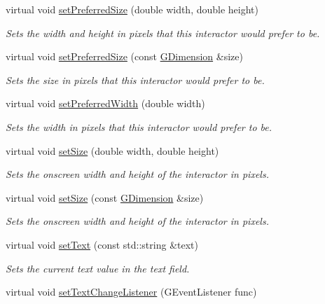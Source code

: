 \begin{DoxyCompactItemize}
virtual void \mbox{\hyperlink{classGInteractor_a042c5ae19430d765ef552371cae3632c}{set\+Preferred\+Size}} (double width, double height)
\begin{DoxyCompactList}\small\item\em Sets the width and height in pixels that this interactor would prefer to be. \end{DoxyCompactList}\item 
virtual void \mbox{\hyperlink{classGInteractor_aa22d9be4bc0e078bb0ea69b0fc9d7c75}{set\+Preferred\+Size}} (const \mbox{\hyperlink{classGDimension}{G\+Dimension}} \&size)
\begin{DoxyCompactList}\small\item\em Sets the size in pixels that this interactor would prefer to be. \end{DoxyCompactList}\item 
virtual void \mbox{\hyperlink{classGInteractor_a3db429ab2fa52efd187eec0ed8cdd9f2}{set\+Preferred\+Width}} (double width)
\begin{DoxyCompactList}\small\item\em Sets the width in pixels that this interactor would prefer to be. \end{DoxyCompactList}\item 
virtual void \mbox{\hyperlink{classGInteractor_aca25d49481f9bf5fc8f7df4c086c4ce7}{set\+Size}} (double width, double height)
\begin{DoxyCompactList}\small\item\em Sets the onscreen width and height of the interactor in pixels. \end{DoxyCompactList}\item 
virtual void \mbox{\hyperlink{classGInteractor_ae2b628228f192c2702c4ce941b2af68f}{set\+Size}} (const \mbox{\hyperlink{classGDimension}{G\+Dimension}} \&size)
\begin{DoxyCompactList}\small\item\em Sets the onscreen width and height of the interactor in pixels. \end{DoxyCompactList}\item 
virtual void \mbox{\hyperlink{classGTextField_ac1ae51949d41ee9054634be5967d91b8}{set\+Text}} (const std\+::string \&text)
\begin{DoxyCompactList}\small\item\em Sets the current text value in the text field. \end{DoxyCompactList}\item 
virtual void \mbox{\hyperlink{classGTextField_ae41284f9c540110180ac0ad6beca5cb0}{set\+Text\+Change\+Listener}} (G\+Event\+Listener func)

\end{DoxyCompactItemize}
